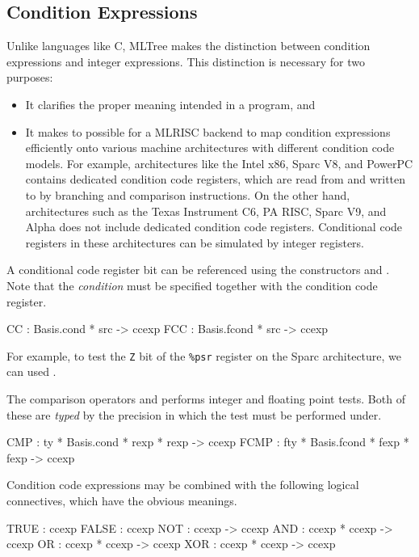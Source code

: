 \subsection{Condition Expressions}
Unlike languages like C, MLTree makes the distinction between condition 
expressions and integer expressions.  This distinction is necessary for
two purposes:
\begin{itemize}
  \item It clarifies the proper meaning intended in a program, and
  \item It makes to possible for a MLRISC backend to map condition
expressions efficiently onto various machine architectures with different
condition code models.  For example, architectures like the Intel x86, 
Sparc V8, and PowerPC contains dedicated condition code registers, which
are read from and written to by branching and comparison instructions.
On the other hand, architectures such as the Texas Instrument C6, PA RISC,
Sparc V9, and Alpha does not include dedicated condition code registers.
Conditional code registers in these architectures
can be simulated by integer registers.
\end{itemize}


A conditional code register bit can be referenced using the constructors
 and .  Note that the \emph{condition} must be specified
together with the condition code register.
\begin{SML}
   CC   : Basis.cond * src -> ccexp 
   FCC  : Basis.fcond * src -> ccexp    
\end{SML}
For example, to test the \verb|Z| bit of the \verb|%psr| register on the
Sparc architecture, we can used .  

The comparison operators  and  performs integer and
floating point tests.  Both of these are \emph{typed} by the precision
in which the test must be performed under.
\begin{SML}
   CMP  : ty * Basis.cond * rexp * rexp -> ccexp  
   FCMP : fty * Basis.fcond * fexp * fexp -> ccexp
\end{SML}

Condition code expressions may be combined with the following
logical connectives, which have the obvious meanings.
\begin{SML}
   TRUE  : ccexp 
   FALSE : ccexp 
   NOT   : ccexp -> ccexp 
   AND   : ccexp * ccexp -> ccexp 
   OR    : ccexp * ccexp -> ccexp 
   XOR   : ccexp * ccexp -> ccexp 
\end{SML}

